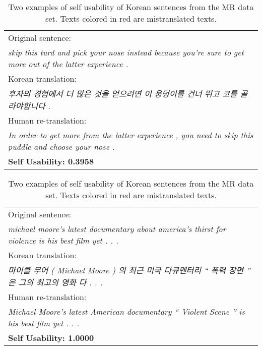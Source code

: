 \documentclass{article}
\begin{document}
\begin{CJK}{UTF8}{}
\begin{table}[!ht]
	\scriptsize
    \centering
    \begin{subtable}{0.47\textwidth}
        \centering
        \begin{tabularx}{\textwidth}{X}
            Original sentence: \\
            \textit{skip this turd and pick your nose instead because you're sure to get more out of the latter experience .} \\ \hline
            Korean translation: \\
            \textit{\textcolor[rgb]{1,0,0}{후자의 경험에서 더 많은 것을 얻으려면} 이 웅덩이를 건너 뛰고 \textcolor[rgb]{1,0,0}{코를 골라야합니다} .} \\ \hline
            Human re-translation: \\ 
            \textit{In order to get more from the latter experience , you need to skip this puddle and choose your nose .} \\ \hline
            \textbf{Self Usability: 0.3958} \\
        \end{tabularx}
        \caption{Low self usability example}
    \end{subtable}
    \begin{subtable}{0.47\textwidth}
        \centering
        \begin{tabularx}{\textwidth}{X}
            Original sentence: \\
            \textit{michael moore's latest documentary about america's thirst for violence is his best film yet . . .} \\ \hline
            Korean translation: \\
            \textit{마이클 무어 ( Michael Moore ) 의 최근 미국 다큐멘터리 \textcolor[rgb]{1,0,0}{`` 폭력 장면 ''} 은 그의 최고의 영화 다 . . .} \\ \hline
            Human re-translation: \\
            \textit{Michael Moore's latest American documentary `` Violent Scene '' is his best film yet . . .} \\ \hline
            \textbf{Self Usability: 1.0000} \\
        \end{tabularx}
        \caption{High self usability example}
    \end{subtable}
    \caption{Two examples of self usability of Korean sentences from the MR data set. Texts colored in \textcolor[rgb]{1,0,0}{red} are mistranslated texts.}
    \label{tab:usability}
\end{table}
\end{CJK}
\end{document}
